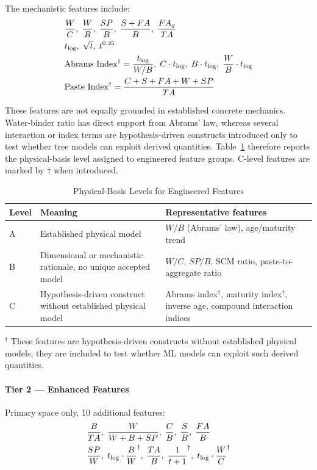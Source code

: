 \documentclass[journal]{IEEEtran}
\begin{document}
The mechanistic features include:
\begin{align}
&\frac{W}{C},\; \frac{W}{B},\; \frac{SP}{B},\; \frac{S + FA}{B},\; \frac{FA_g}{TA} \notag\\
&t_{\log},\; \sqrt{t},\; t^{0.25} \notag\\
&\text{Abrams Index}^{\dagger} = \frac{t_{\log}}{W/B},\; C \cdot t_{\log},\; B \cdot t_{\log},\; \frac{W}{B} \cdot t_{\log} \notag\\
&\text{Paste Index}^{\dagger} = \frac{C + S + FA + W + SP}{TA} \notag
\end{align}

These features are not equally grounded in established concrete mechanics. Water-binder ratio has direct support from Abrams' law, whereas several interaction or index terms are hypothesis-driven constructs introduced only to test whether tree models can exploit derived quantities. Table~\ref{tab:feature_basis} therefore reports the physical-basis level assigned to engineered feature groups. C-level features are marked by $\dagger$ when introduced.

\begin{table}[!t]
\renewcommand{\arraystretch}{1.15}
\caption{Physical-Basis Levels for Engineered Features}
\label{tab:feature_basis}
\centering
\begin{tabular}{p{}p{}p{}}
\toprule
\textbf{Level} & \textbf{Meaning} & \textbf{Representative features} \\
\midrule
A & Established physical model & $W/B$ (Abrams' law), age/maturity trend \\
B & Dimensional or mechanistic rationale, no unique accepted model & $W/C$, $SP/B$, SCM ratio, paste-to-aggregate ratio \\
C & Hypothesis-driven construct without established physical model & Abrams index$^\dagger$, maturity index$^\dagger$, inverse age, compound interaction indices \\
\bottomrule
\end{tabular}
\vspace{0.5mm}
{\footnotesize $^\dagger$ These features are hypothesis-driven constructs without established physical models; they are included to test whether ML models can exploit such derived quantities.}
\end{table}

\paragraph{Tier 2 --- Enhanced Features}
Primary space only, 10 additional features:
\begin{align}
&\frac{B}{TA},\; \frac{W}{W + B + SP},\; \frac{C}{B},\; \frac{S}{B},\; \frac{FA}{B} \notag\\
&\frac{SP}{W},\; t_{\log} \cdot \frac{B}{W}^{\dagger},\; \frac{TA}{B},\; \frac{1}{t + 1}^{\dagger},\; t_{\log} \cdot \frac{W}{C}^{\dagger} \notag
\end{align}
\end{document}

